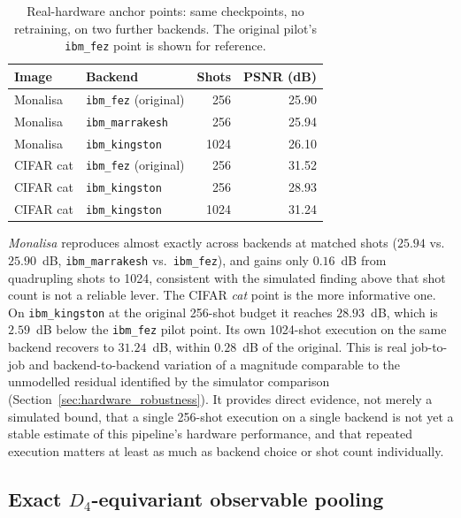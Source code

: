 \documentclass[pdflatex,sn-basic]{sn-jnl}
\begin{document}
\begin{table}[t]
  \centering
  \caption{Real-hardware anchor points: same checkpoints, no retraining, on two
           further backends. The original pilot's \texttt{ibm\_fez} point is
           shown for reference.}
  \label{tab:hardware_anchors}
  \begin{tabular}{@{}l l r r@{}}
    \toprule
    Image       & Backend                       & Shots & PSNR (dB) \\
    \midrule
    Monalisa    & \texttt{ibm\_fez} (original)  &  256  & 25.90     \\
    Monalisa    & \texttt{ibm\_marrakesh}       &  256  & 25.94     \\
    Monalisa    & \texttt{ibm\_kingston}        & 1024  & 26.10     \\
    \addlinespace
    CIFAR cat   & \texttt{ibm\_fez} (original)  &  256  & 31.52     \\
    CIFAR cat   & \texttt{ibm\_kingston}        &  256  & 28.93     \\
    CIFAR cat   & \texttt{ibm\_kingston}        & 1024  & 31.24     \\
    \bottomrule
  \end{tabular}
\end{table}

\textit{Monalisa} reproduces almost exactly across backends at matched shots
($25.94$ vs.\ $25.90$~dB, \texttt{ibm\_marrakesh} vs.\ \texttt{ibm\_fez}), and
gains only $0.16$~dB from quadrupling shots to 1024, consistent with the
simulated finding above that shot count is not a reliable lever. The CIFAR
\textit{cat} point is the more informative one. On \texttt{ibm\_kingston} at the
original 256-shot budget it reaches $28.93$~dB, which is $2.59$~dB below the
\texttt{ibm\_fez} pilot point. Its own 1024-shot execution on the same backend
recovers to $31.24$~dB, within $0.28$~dB of the original. This is real
job-to-job and backend-to-backend variation of a magnitude comparable to the
unmodelled residual identified by the simulator comparison
(Section~\ref{sec:hardware_robustness}). It provides direct evidence, not merely
a simulated bound, that a single 256-shot execution on a single backend is not
yet a stable estimate of this pipeline's hardware performance, and that repeated
execution matters at least as much as backend choice or shot count individually.

\subsection{Exact \texorpdfstring{$D_4$}{D4}-equivariant observable pooling}
\label{sec:d4}
\label{sec:symmetry}
\end{document}
